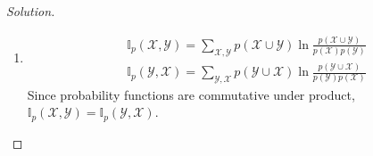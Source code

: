 \documentclass{amsart}
\theoremstyle{plain}
\newenvironment{solution}{\begin{proof}[Solution]}{\end{proof}}
\newcommand{\set}[1]{\mathcal{#1}}
\newcommand{\mutinf}{\mathbb{I}_p}
\begin{document}
\begin{solution}~\\
  \begin{enumerate}[label=(\roman*)]
    \item
      \begin{align*}
        &\mutinf(\set{X},\set{Y})=\sum_{\set{X},\set{Y}} p(\set{X}\cup\set{Y})\ln
          \frac{p(\set{X}\cup\set{Y})}{p(\set{X})p(\set{Y})}\\
        &\mutinf(\set{Y},\set{X})=\sum_{\set{Y},\set{X}} p(\set{Y}\cup\set{X})\ln
          \frac{p(\set{Y}\cup\set{X})}{p(\set{Y})p(\set{X})}
      \end{align*}
      Since probability functions are commutative under product, $\mutinf(\set{X},\set{Y})=
      \mutinf(\set{Y},\set{X})$.
  \end{enumerate}
\end{solution}

\newpage

\printbibliography[]
\end{document}
